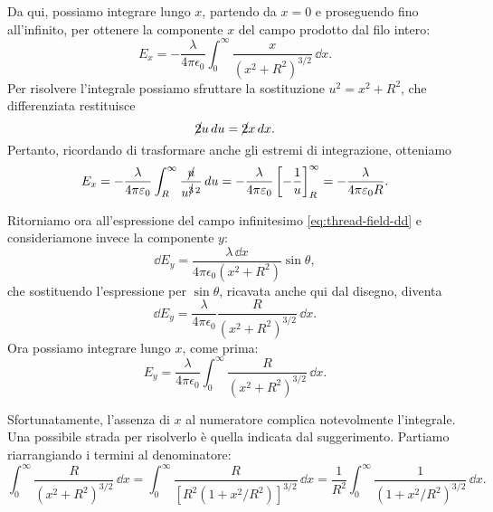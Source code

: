 \documentclass[10pt]{gulartcl}
\begin{document}
\begin{solution}
Da qui, possiamo integrare lungo $x$, partendo da $x = 0$ e proseguendo
fino all’infinito, per ottenere la componente $x$ del campo prodotto dal
filo intero:
\begin{equation}
    E_x = -\frac{\lambda}{4 \pi \epsilon_0} \int_{0}^{\infty}
    \frac{x}{(x^{2} + R^{2})^{3/2}}\, \dd x.
\end{equation}
Per risolvere l’integrale possiamo sfruttare la sostituzione $u^2 = x^2 +
R^2$, che differenziata restituisce
\begin{equation}
    \cancel{2}u \, d u = \cancel{2}x \, d x.
\end{equation}
Pertanto, ricordando di trasformare anche gli estremi di integrazione,
otteniamo
\begin{equation}
    E_x = - \frac{\lambda}{4 \pi \varepsilon_0} \int_{R}^{\infty}
    \frac{\cancel{u}}{u^{\cancel{3}\, 2}} \, d u = - \frac{\lambda}{4 \pi
    \varepsilon_0} \left[-\frac{1}{u}\right]_{R}^{\infty} = -
    \frac{\lambda}{4\pi\varepsilon_0 R}.
\end{equation}

Ritorniamo ora all’espressione del campo infinitesimo
\eqref{eq:thread-field-dd} e consideriamone invece la componente $y$:
\begin{equation}
    \dd E_y = \frac{\lambda\, \dd x}{4\pi\epsilon_0 (x^{2} + R^{2})}
    \sin\theta,
\end{equation}
che sostituendo l’espressione per $\sin\theta$, ricavata anche qui dal
disegno, diventa
\begin{equation}
    \dd E_y = \frac{\lambda}{4\pi\epsilon_0} \frac{R}{(x^{2} +
    R^{2})^{3/2}}\, \dd x.
\end{equation}
Ora possiamo integrare lungo $x$, come prima:
\begin{equation}
    E_y = \frac{\lambda}{4\pi\epsilon_0} \int_{0}^{\infty} \frac{R}{(x^{2}
    + R^{2})^{3/2}} \, \dd x.
\end{equation}

Sfortunatamente, l’assenza di $x$ al numeratore complica notevolmente
l’integrale. Una possibile strada per risolverlo è quella indicata dal
suggerimento. Partiamo riarrangiando i termini al denominatore:
\begin{equation}
    \int_{0}^{\infty} \frac{R}{(x^{2} + R^{2})^{3/2}} \, \dd x =
    \int_{0}^{\infty} \frac{R}{[R^2(1 + x^2 / R^2)]^{3/2}}\, \dd x =
    \frac{1}{R^2} \int_{0}^{\infty} \frac{1}{(1 + x^{2} / R^{2})^{3/2}}\,
    \dd x.
\end{equation}
\end{solution}
\end{document}
